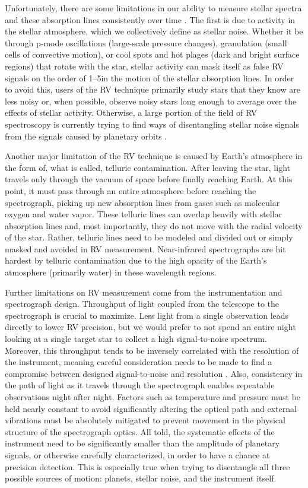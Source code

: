 Unfortunately, there are some limitations in our ability to measure stellar spectra and these absorption lines consistently over time \citep{lovis_radial_2011}. The first is due to activity in the stellar atmosphere, which we collectively define as stellar noise. Whether it be through p-mode oscillations (large-scale pressure changes), granulation (small cells of convective motion), or cool spots and hot plages (dark and bright surface regions) that rotate with the star, stellar activity can mask itself as false RV signals on the order of 1--5\ms in the motion of the stellar absorption lines. In order to avoid this, users of the RV technique primarily study stars that they know are less noisy or, when possible, observe noisy stars long enough to average over the effects of stellar activity. Otherwise, a large portion of the field of RV spectroscopy is currently trying to find ways of disentangling stellar noise signals from the signals caused by planetary orbits \citep[e.g.][]{davis_insights_2017, dumusque_measuring_2018}.

Another major limitation of the RV technique is caused by Earth's atmosphere in the form of, what is called, telluric contamination. After leaving the star, light travels only through the vacuum of space before finally reaching Earth. At this point, it must pass through an entire atmosphere before reaching the spectrograph, picking up new absorption lines from gases such as molecular oxygen and water vapor. These telluric lines can overlap heavily with stellar absorption lines and, most importantly, they do not move with the radial velocity of the star. Rather, telluric lines need to be modeled and divided out or simply masked and avoided in RV measurement. Near-infrared spectrographs are hit hardest by telluric contamination due to the high opacity of the Earth's atmosphere (primarily water) in these wavelength regions.

Further limitations on RV measurement come from the instrumentation and spectrograph design. Throughput of light coupled from the telescope to the spectrograph is crucial to maximize. Less light from a single observation leads directly to lower RV precision, but we would prefer to not spend an entire night looking at a single target star to collect a high signal-to-noise spectrum. Moreover, this throughput tends to be inversely correlated with the resolution of the instrument, meaning careful consideration needs to be made to find a compromise between designed signal-to-noise and resolution \citep{davis_insights_2017}. Also, consistency in the path of light as it travels through the spectrograph enables repeatable observations night after night. Factors such as temperature and pressure must be held nearly constant to avoid significantly altering the optical path and external vibrations must be absolutely mitigated to prevent movement in the physical structure of the spectrograph optics. All told, the systematic effects of the instrument need to be significantly smaller than the amplitude of planetary signals, or otherwise carefully characterized, in order to have a chance at precision detection. This is especially true when trying to disentangle all three possible sources of motion: planets, stellar noise, and the instrument itself.

